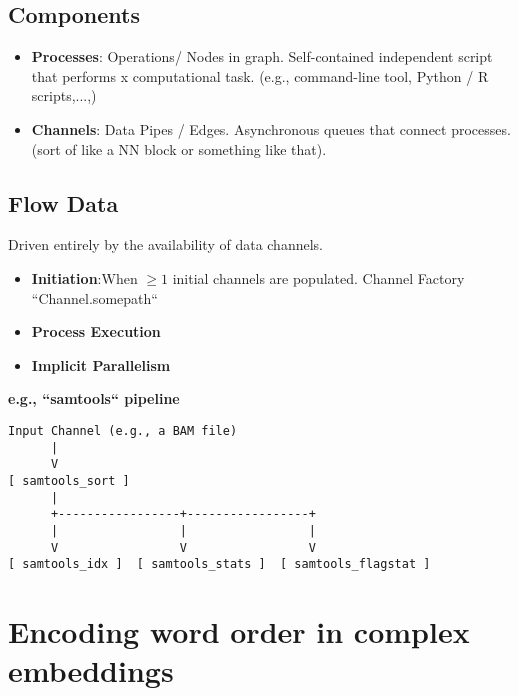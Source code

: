\documentclass[../main.tex]{subfiles}
\begin{document}
\subsection{Components}
\begin{itemize}
    \item \textbf{Processes}: Operations/ Nodes in graph. Self-contained independent script that performs x computational task. (e.g., command-line tool, Python / R scripts,...,)
    \item\textbf{Channels}: Data Pipes / Edges. Asynchronous queues that connect processes. (sort of like a NN block or something like that).
\end{itemize}

\subsection{Flow Data}
Driven entirely by the availability of data channels.
\begin{itemize}
  
    \item \textbf{Initiation}:When $\geq 1$ initial channels are populated. Channel Factory ``Channel.somepath``
    \item \textbf{Process Execution}  
    \item \textbf{Implicit Parallelism}
\end{itemize}

\textbf{e.g., ``samtools`` pipeline}

\begin{verbatim}
Input Channel (e.g., a BAM file)
      |
      V
[ samtools_sort ]
      |
      +-----------------+-----------------+
      |                 |                 |
      V                 V                 V
[ samtools_idx ]  [ samtools_stats ]  [ samtools_flagstat ]

\end{verbatim}

\hrulefill

\section{Encoding word order in complex embeddings}\cite{gencore_how_sequencing_works}


\hrulefill
\end{document}
